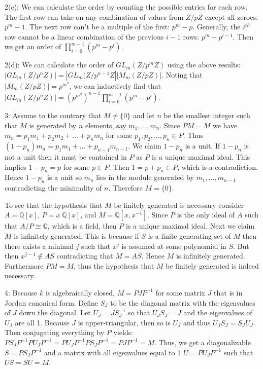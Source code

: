\documentclass[12pt]{article}
\begin{document}
2(c): We can calculate the order by counting the possible entries for each row. The first row can take on any combination of values from $Z / pZ$ except all zeroes: $p^m - 1$. The next row can't be a multiple of the first: $p^m - p$. Generally, the $i^{th}$ row cannot be a linear combination of the previous $i-1$ rows: $p^m-p^{i-1}$. Then we get an order of $\prod_{i=0}^{m-1}(p^m-p^i)$. \newline

2(d): We can calculate the order of $GL_m(Z/p^mZ)$ using the above results: $|GL_m(Z/p^nZ)|=|GL_m(Z/p^{n-1}Z||M_m(Z/pZ)|$. Noting that $|M_m(Z/pZ)|=p^{m^2}$, we can inductively find that $|GL_m(Z/p^nZ)|=(p^{m^2})^{n-1}\prod_{i=0}^{m-1}(p^m-p^i)$. \newline

3: Assume to the contrary that $M \neq \{0\}$ and let $n$ be the smallest integer such that $M$ is generated by $n$ elements, say $m_1, \ldots , m_n$.  Since $PM=M$ we have $m_n = p_1 m_1+ p_2 m_2 + \ldots + p_n m_n$
for some $p_1, p_2, \ldots, p_n \in P$.  Thus $(1-p_n)m_n = p_1m_1+ \ldots + p_{n-1}m_{n-1}$.  We claim $1-p_n$ is a unit.  If $1-p_n$ is not a unit then it must be contained in $P$ as $P$ is a unique maximal ideal.  This implies $1-p_n = p$ for some $p \in P$.  Then $1= p+p_n \in P$, which is a contradiction.  Hence $1-p_n$ is a unit so $m_n$ lies in the module generated by $m_1, \ldots, m_{n-1}$ contradicting the minimality of $n$.  Therefore $M = \{0\}$. \newline

To see that the hypothesis that $M$ be finitely generated is necessary consider $A = \mathbb{Q}[x]$, $P = x\; \mathbb{Q}[x]$, and $M = \mathbb{Q}[x, x^{-1}]$.  Since $P$ is the only ideal of $A$ such that $A/P \cong \mathbb{Q}$, which is a field, then $P$ is a unique maximal ideal.  Next we claim $M$ is infinitely generated.  This is because if $S$ is a finite generating set of $M$ then there exists a minimal $j$ such that $x^j$ is assumed at some polynomial in $S$.  But then $x^{j-1} \notin AS$ contradicting that $M=AS$.  Hence $M$ is infinitely generated.  Furthermore $PM = M$, thus the hypothesis that $M$ be finitely generated is indeed necessary.
 \newline

4: Because $k$ is algebraically closed, $M = PJP^{-1}$ for some matrix $J$ that is in Jordan canonical form. Define $S_J$ to be the diagonal matrix with the eigenvalues of $J$ down the diagonal. Let $U_J = J S_J^{-1}$ so that $U_J S_J = J$ and the eigenvalues of $U_J$ are all 1. Because $J$ is upper-triangular, then so is $U_J$ and thus $U_J S_J = S_J U_J$. Then conjugating everything by $P$ yields: $P S_J P^{-1} P U_J P^{-1} = P U_J P^{-1} P S_J P^{-1} = P J P^{-1} = M$. Thus, we get a diagonalizable $S = P S_J P^{-1}$ and a matrix with all eigenvalues equal to 1 $U = P U_J P^{-1}$ such that $US=SU=M$. \newline
\end{document}
